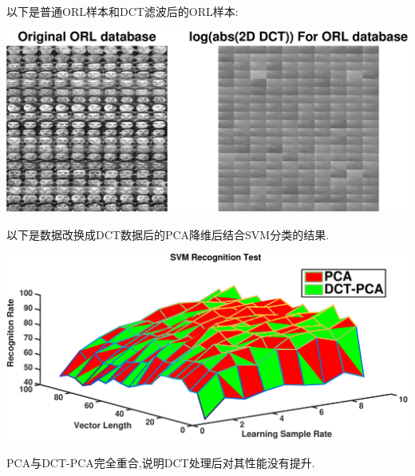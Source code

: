 	以下是普通ORL样本和DCT滤波后的ORL样本:
	
	\begin{center}
	\begin{minipage}[t]{\linewidth}
	\center
	{
	\includegraphics[width=\textwidth]{Img/dct_demo} 
	}
	\end{minipage}
	\medskip
	\end{center}

	以下是数据改换成DCT数据后的PCA降维后结合SVM分类的结果.
	\begin{center}
	\begin{minipage}[t]{\linewidth}
	\center
	{
	\includegraphics[width=\textwidth]{Img/svm_pca_dct} 
	}
	\end{minipage}
	\medskip
	\end{center}
	PCA与DCT-PCA完全重合,说明DCT处理后对其性能没有提升.
	
